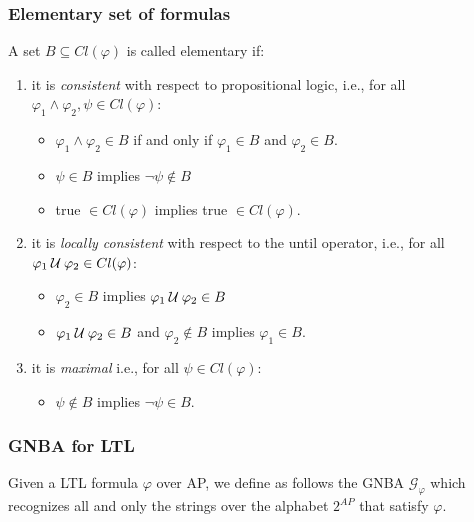 \documentclass{article}
\begin{document}
\subsubsection*{Elementary set of formulas}
A set $B \subseteq Cl(\varphi)$ is called elementary if:
\begin{enumerate}
    \item it is \emph{consistent} with respect to propositional logic, i.e., for all 
            $\varphi_1 \land \varphi_2, \psi \in Cl(\varphi)$:
            \begin{itemize}
                \item $\varphi_1 \land \varphi_2 \in B$ if and only if $\varphi_1 \in B$ and $\varphi_2 \in B$.
                \item $\psi \in B$ implies $\neg \psi \notin B$ 
                \item true $\in Cl(\varphi)$ implies true $\in Cl(\varphi)$.
            \end{itemize}
    \item it is \emph{locally consistent} with respect to the until operator, i.e., for all 
            $\varphi_1 \mathbin{\mathcal{U}} \varphi_2 \in Cl(\varphi)$:
            \begin{itemize}
                \item $\varphi_2 \in B$ implies $\varphi_1 \mathbin{\mathcal{U}} \varphi_2 \in B$
                \item $\varphi_1 \mathbin{\mathcal{U}} \varphi_2 \in B$ and $\varphi_2 \notin B$ implies $\varphi_1 \in B$.
            \end{itemize}
    \item it is \emph{maximal} i.e., for all $\psi \in Cl(\varphi)$:
            \begin{itemize}
                \item $\psi \notin B$ implies $\neg \psi \in B$.
            \end{itemize}
\end{enumerate}

\subsubsection*{GNBA for LTL}
Given a LTL formula $\varphi$ over AP, we define as follows the GNBA $\mathcal{G}_{\varphi}$ which recognizes all
and only the strings over the alphabet $2^{AP}$ that satisfy $\varphi$.
\end{document}
